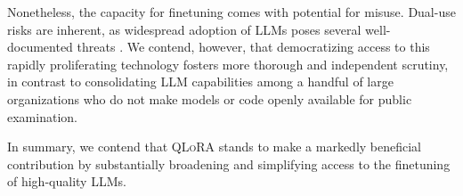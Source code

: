 Nonetheless, the capacity for finetuning comes with potential for misuse. Dual-use risks are inherent, as widespread adoption of LLMs poses several well-documented threats \citep{bommasani2021opportunities,bender2021dangers}. We contend, however, that democratizing access to this rapidly proliferating technology fosters more thorough and independent scrutiny, in contrast to consolidating LLM capabilities among a handful of large organizations who do not make models or code openly available for public examination.

In summary, we contend that \textsc{QLoRA} stands to make a markedly beneficial contribution by substantially broadening and simplifying access to the finetuning of high-quality LLMs.